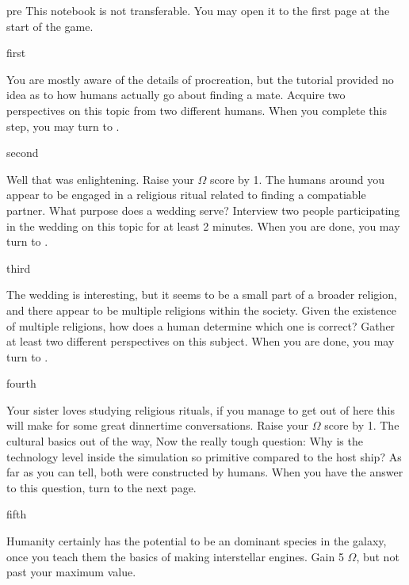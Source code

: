 \documentclass[notebook]{guildcamp1}
\begin{document}

\startnotebook{\nAlienQuestions{}}

\begin{page}{pre}
This notebook is not transferable. You may open it to the first page at the start of the game.
\end{page}

\begin{page}{first}

You are mostly aware of the details of procreation, but the tutorial provided no idea as to how humans actually go about finding a mate.
Acquire two perspectives on this topic from two different humans. When you complete this step, you may turn to .

\end{page}

\begin{page}{second}

Well that was enlightening. Raise your $\Omega$ score by 1. The humans around you appear to be engaged in a religious ritual related to
finding a compatiable partner. What purpose does a wedding serve? Interview two people participating in the wedding on
this topic for at least 2 minutes. When you are done, you may turn to .

\end{page}

\begin{page}{third}

The wedding is interesting, but it seems to be a small part of a broader religion, and there appear to be multiple religions within the society.
Given the existence of multiple religions, how does a human determine which one is correct? Gather at least two different perspectives on this subject.
When you are done, you may turn to .

\end{page}

\begin{page}{fourth}

Your sister loves studying religious rituals, if you manage to get out of here this will make for some great dinnertime conversations.
Raise your $\Omega$ score by 1. The cultural basics out of the way, Now the really tough question: 
Why is the technology level inside the simulation so primitive compared to the host ship? As far as you can tell, both were constructed by humans.
When you have the answer to this question, turn to the next page.

\end{page}

\begin{page}{fifth}

Humanity certainly has the potential to be an dominant species in the galaxy, once you teach them the basics of making interstellar engines.
Gain 5 $\Omega$, but not past your maximum value.
\end{page}

\endnotebook
\end{document}
